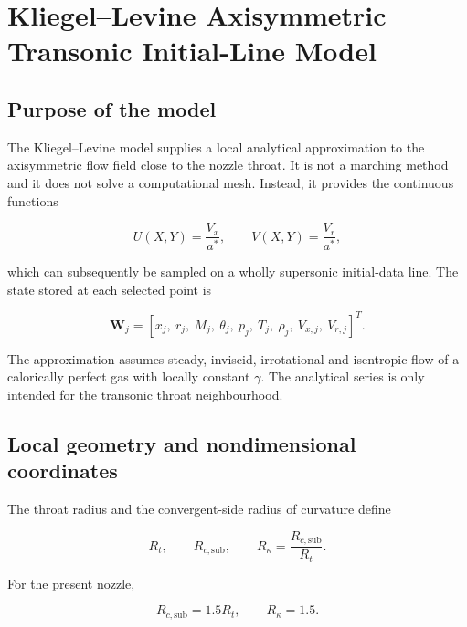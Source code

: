 \section{Kliegel--Levine Axisymmetric Transonic Initial-Line Model}
\label{sec:kliegel_levine_initial_line}

\subsection{Purpose of the model}

The Kliegel--Levine model supplies a local analytical approximation to the
axisymmetric flow field close to the nozzle throat.  It is not a marching
method and it does not solve a computational mesh.  Instead, it provides the
continuous functions

\begin{equation}
    U(X,Y)=\frac{V_x}{a^*},
    \qquad
    V(X,Y)=\frac{V_r}{a^*},
\end{equation}

which can subsequently be sampled on a wholly supersonic initial-data line.
The state stored at each selected point is

\begin{equation}
    \boldsymbol{W}_j=
    \left[
        x_j,\ r_j,\ M_j,\ \theta_j,\ p_j,\ T_j,\ \rho_j,
        \ V_{x,j},\ V_{r,j}
    \right]^T.
\end{equation}

The approximation assumes steady, inviscid, irrotational and isentropic flow
of a calorically perfect gas with locally constant \(\gamma\).  The analytical
series is only intended for the transonic throat neighbourhood.

\subsection{Local geometry and nondimensional coordinates}

The throat radius and the convergent-side radius of curvature define

\begin{equation}
    R_t,
    \qquad
    R_{c,\mathrm{sub}},
    \qquad
    R_\kappa=\frac{R_{c,\mathrm{sub}}}{R_t}.
\end{equation}

For the present nozzle,

\begin{equation}
    R_{c,\mathrm{sub}}=1.5R_t,
    \qquad
    R_\kappa=1.5.
\end{equation}

